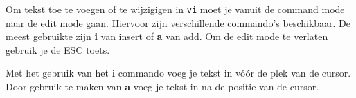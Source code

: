 Om tekst toe te voegen of te wijzigigen in \texttt{vi} moet je vanuit de command mode naar de edit mode gaan. Hiervoor zijn verschillende commando's beschikbaar. De meest gebruikte zijn \textbf{i} van insert of \textbf{a} van add. Om de edit mode te verlaten gebruik je de \textsc{ESC} toets.

Met het gebruik van het \textbf{i} commando voeg je tekst in v\'o\'or de plek van de cursor. Door gebruik te maken van \textbf{a} voeg je tekst in na de positie van de cursor.
